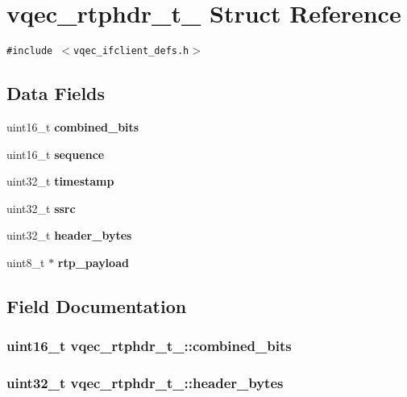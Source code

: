\section{vqec\_\-rtphdr\_\-t\_\- Struct Reference}
\label{structvqec__rtphdr__t__}
{\tt \#include $<$vqec\_\-ifclient\_\-defs.h$>$}

\subsection*{Data Fields}
\begin{CompactItemize}
\item 
uint16\_\-t \bf{combined\_\-bits}
\item 
uint16\_\-t \bf{sequence}
\item 
uint32\_\-t \bf{timestamp}
\item 
uint32\_\-t \bf{ssrc}
\item 
uint32\_\-t \bf{header\_\-bytes}
\item 
uint8\_\-t $\ast$ \bf{rtp\_\-payload}
\end{CompactItemize}


\subsection{Field Documentation}
\subsubsection{\setlength{\rightskip}{0pt plus 5cm}uint16\_\-t \bf{vqec\_\-rtphdr\_\-t\_\-::combined\_\-bits}}\label{structvqec__rtphdr__t___d7918aa822e805e2a3c17e8fec6f360b}


\subsubsection{\setlength{\rightskip}{0pt plus 5cm}uint32\_\-t \bf{vqec\_\-rtphdr\_\-t\_\-::header\_\-bytes}}\label{structvqec__rtphdr__t___af388ec79326616a7fb7f217f2666b30}


